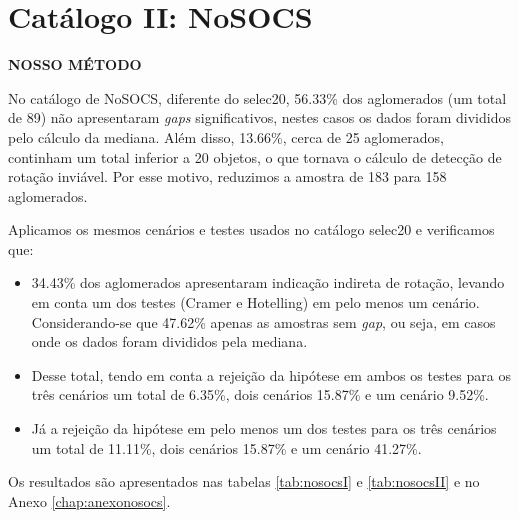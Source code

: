 \section{Catálogo II: NoSOCS}
\textbf{NOSSO MÉTODO}

No catálogo de NoSOCS, diferente do selec20, 56.33\% dos aglomerados (um total de 89) não apresentaram \textit{gaps} significativos, nestes casos os dados foram divididos pelo cálculo da mediana. Além disso, 13.66\%, cerca de 25 aglomerados, continham um total inferior a 20 objetos, o que tornava o cálculo de detecção de rotação inviável. Por esse motivo, reduzimos a amostra de 183 para 158 aglomerados.

Aplicamos os mesmos cenários e testes usados no catálogo selec20 e verificamos que:

\begin{itemize}
   	\item 34.43\% dos aglomerados apresentaram indicação indireta de rotação, levando em conta um dos testes (Cramer e Hotelling) em pelo menos um cenário. Considerando-se que 47.62\% apenas as amostras sem \textit{gap}, ou seja, em casos onde os dados foram divididos pela mediana. 
   	\item Desse total, tendo em conta a rejeição da hipótese em ambos os testes para os três cenários um total de 6.35\%, dois cenários 15.87\% e um cenário 9.52\%.
   	\item Já a rejeição da hipótese em pelo menos um dos testes para os três cenários um total de 11.11\%, dois cenários 15.87\% e um cenário 41.27\%. 
 \end{itemize} 

 Os resultados são apresentados nas tabelas \ref{tab:nosocsI} e \ref{tab:nosocsII} e no Anexo \ref{chap:anexonosocs}. 

